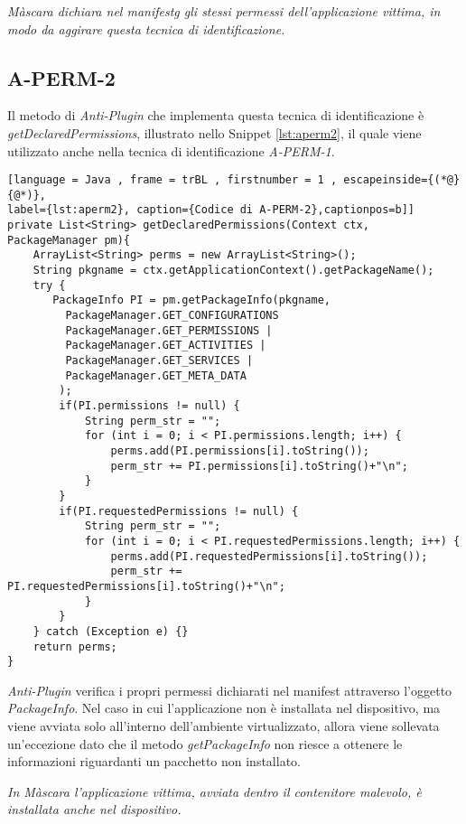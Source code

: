 \emph{Màscara dichiara nel \gls{manifestg} gli stessi permessi dell'applicazione vittima, in modo da aggirare questa tecnica di identificazione.}

\newpage

\subsection*{A-PERM-2}
\label{a-perm-2}
Il metodo di \emph{Anti-Plugin} che implementa questa tecnica di identificazione è \emph{getDeclaredPermissions}, illustrato nello Snippet \ref{lst:aperm2}, il quale viene utilizzato anche nella tecnica di identificazione \emph{A-PERM-1}.

\begin{lstlisting}[language = Java , frame = trBL , firstnumber = 1 , escapeinside={(*@}{@*)},
label={lst:aperm2}, caption={Codice di A-PERM-2},captionpos=b]]
private List<String> getDeclaredPermissions(Context ctx, PackageManager pm){
    ArrayList<String> perms = new ArrayList<String>();
    String pkgname = ctx.getApplicationContext().getPackageName();
    try {
       PackageInfo PI = pm.getPackageInfo(pkgname,
         PackageManager.GET_CONFIGURATIONS 
         PackageManager.GET_PERMISSIONS |
         PackageManager.GET_ACTIVITIES |
         PackageManager.GET_SERVICES |
         PackageManager.GET_META_DATA
        );
        if(PI.permissions != null) {
            String perm_str = "";
            for (int i = 0; i < PI.permissions.length; i++) {
                perms.add(PI.permissions[i].toString());
                perm_str += PI.permissions[i].toString()+"\n";
            }
        }
        if(PI.requestedPermissions != null) {
            String perm_str = "";
            for (int i = 0; i < PI.requestedPermissions.length; i++) {
                perms.add(PI.requestedPermissions[i].toString());
                perm_str += PI.requestedPermissions[i].toString()+"\n";
            }
        }
    } catch (Exception e) {}
    return perms;
}
\end{lstlisting}

\emph{Anti-Plugin} verifica i propri permessi dichiarati nel manifest attraverso l'oggetto \emph{PackageInfo}. Nel caso in cui l'applicazione non è installata nel dispositivo, ma viene avviata solo all'interno dell'ambiente virtualizzato, allora viene sollevata un'eccezione dato che il metodo \emph{getPackageInfo} non riesce a ottenere le informazioni riguardanti un pacchetto non installato.

\emph{In Màscara l'applicazione vittima, avviata dentro il contenitore malevolo, è installata anche nel dispositivo.}

